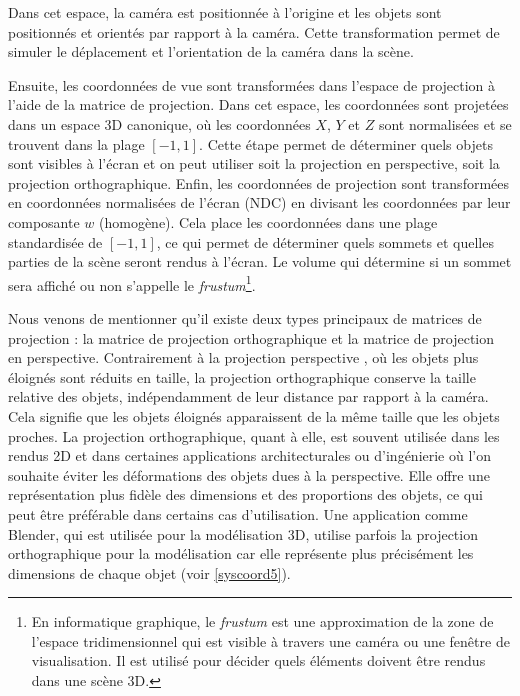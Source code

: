 Dans cet espace, la caméra est positionnée à l'origine et les objets sont positionnés et orientés par rapport à la caméra. Cette transformation permet de simuler le déplacement et l'orientation de la caméra dans la scène. 

Ensuite, les coordonnées de vue sont transformées dans l'espace de projection à l'aide de la matrice de projection. Dans cet espace, les coordonnées sont projetées dans un espace 3D canonique, où les coordonnées $X$, $Y$ et $Z$ sont normalisées et se trouvent dans la plage $[-1, 1]$. Cette étape permet de déterminer quels objets sont visibles à l'écran et on peut utiliser soit la projection en perspective, soit la projection orthographique. Enfin, les coordonnées de projection sont transformées en coordonnées normalisées de l'écran (NDC) en divisant les coordonnées par leur composante $w$ (homogène). Cela place les coordonnées dans une plage standardisée de $[-1, 1]$, ce qui permet de déterminer quels sommets et quelles parties de la scène seront rendus à l'écran. Le volume qui détermine si un sommet sera affiché ou non s'appelle le \textit{frustum}\footnote{En informatique graphique, le \textit{frustum} est une approximation de la zone de l'espace tridimensionnel qui est visible à travers une caméra ou une fenêtre de visualisation. Il est utilisé pour décider quels éléments doivent être rendus dans une scène 3D.}.




Nous venons de mentionner qu'il existe deux types principaux de matrices de projection : la matrice de projection orthographique et la matrice de projection en perspective. Contrairement à la projection perspective , où les objets plus éloignés sont réduits en taille, la projection orthographique conserve la taille relative des objets, indépendamment de leur distance par rapport à la caméra. Cela signifie que les objets éloignés apparaissent de la même taille que les objets proches. La projection orthographique, quant à elle, est souvent utilisée dans les rendus 2D et dans certaines applications architecturales ou d'ingénierie où l'on souhaite éviter les déformations des objets dues à la perspective. Elle offre une représentation plus fidèle des dimensions et des proportions des objets, ce qui peut être préférable dans certains cas d'utilisation. Une application comme Blender, qui est utilisée pour la modélisation 3D, utilise parfois la projection orthographique pour la modélisation car elle représente plus précisément les dimensions de chaque objet (voir \ref{syscoord5}).

